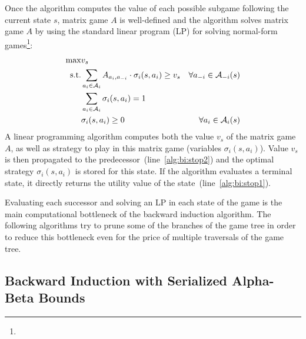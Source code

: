 Once the algorithm computes the value of each possible subgame following the current state $s$, matrix game $A$ is well-defined and the algorithm
solves matrix game $A$ by using the standard linear program (LP) for solving normal-form games\footnote{}:
\begin{eqnarray}
\max & v_s & \\
\textrm{s.t.} & \sum_{a_i \in \mathcal{A}_{i}}A_{a_i,a_{-i}} \cdot \sigma_i(s,a_i) \geq v_s & \forall a_{-i} \in \mathcal{A}_{-i}(s)\\
& \sum_{a_{i} \in \mathcal{A}_{i}} \sigma_i(s,a_{i}) = 1 \\
& \sigma_i(s,a_{i}) \geq 0 & \forall a_{i} \in \mathcal{A}_{i}(s)
\end{eqnarray}
A linear programming algorithm computes both the value $v_s$ of the matrix game $A$, as well as strategy to play in this matrix game (variables $\sigma_i(s,a_i)$).
Value $v_s$ is then propagated to the predecessor~(line~\ref{alg:bi:stop2}) and the optimal strategy $\sigma_i(s,a_i)$ is stored for this state.
If the algorithm evaluates a terminal state, it directly returns the utility value of the state~(line~\ref{alg:bi:stop1}).

Evaluating each successor and solving an LP in each state of the game is the main computational bottleneck of the backward induction algorithm.
The following algorithms try to prune some of the branches of the game tree in order to reduce this bottleneck even for the price of multiple traversals of the game tree.

\subsection{Backward Induction with Serialized Alpha-Beta Bounds}\label{sec:algs:biab}

